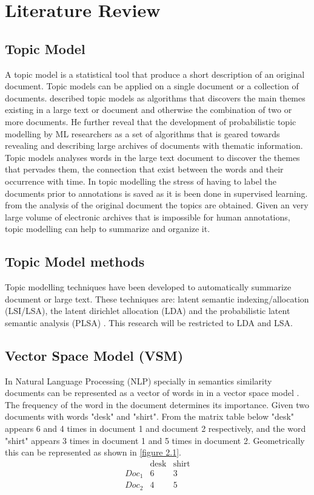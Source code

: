 \chapter{Literature Review}
\section{Topic Model}  
A topic model is a statistical tool that produce a short description of an original document. Topic models can be applied on a single document or a collection of documents. \citep{blei2012surveying} described topic models as algorithms that discovers the main themes existing in a large text or document and otherwise the combination of two or more documents. He further reveal that the development of probabilistic topic modelling by ML  researchers as a set of algorithms that is geared towards revealing and describing large archives of documents with thematic information. Topic models analyses words in the large text document to discover the themes that pervades them, the connection that exist between the words and their occurrence with time. In topic modelling the stress of having to label the documents prior to annotations is saved as it is been done in supervised learning. from the analysis of the original document the topics are obtained. Given an very large volume of electronic archives that is impossible for human annotations, topic modelling can help to summarize and organize it.
\section{Topic Model methods}
Topic modelling techniques have been developed to automatically summarize document or large text. These techniques are: latent semantic indexing/allocation  (LSI/LSA), the latent dirichlet allocation (LDA) and the probabilistic latent semantic analysis (PLSA) . This research will be restricted to LDA and LSA.
\section{Vector Space Model (VSM)}

In Natural Language Processing (NLP) specially in semantics similarity documents can be represented as a vector of words in in a vector space model \cite{salton1975vector}. The frequency of the word in the document determines its importance. Given two documents with words  "desk" and "shirt". From the matrix table below "desk" appears 6 and 4 times in document 1 and document 2 respectively, and the word "shirt" appears 3 times in document 1 and 5 times in document 2. Geometrically this can be represented as shown in \eqref{figure 2.1}.
$$\begin{array}{cccc}
 &\text{desk} & \text{shirt} \\ 
 Doc_1 & 6 & 3\\ 
 Doc_2 & 4 & 5
\end{array} $$

